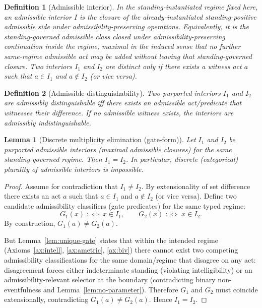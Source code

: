 \documentclass[12pt]{article}
\newtheorem{definition}{Definition}
\newtheorem{lemma}{Lemma}
\begin{document}
\begin{definition}[Admissible interior]
\label{def:interior}
In the standing-instantiated regime fixed here, an \emph{admissible interior} $I$ is the closure of the already-instantiated standing-positive admissible side under admissibility-preserving operations.
Equivalently, it is the standing-governed admissible class closed under admissibility-preserving continuation inside the regime, maximal in the induced sense that no further same-regime admissible act may be added without leaving that standing-governed closure.
Two interiors $I_1$ and $I_2$ are distinct only if there exists a witness act $a$ such that $a\in I_1$ and $a\notin I_2$ (or vice versa).
\end{definition}

\begin{definition}[Admissible distinguishability]
Two purported interiors $I_1$ and $I_2$ are \emph{admissibly distinguishable} iff there exists an admissible act/predicate that witnesses their difference.
If no admissible witness exists, the interiors are admissibly indistinguishable.
\end{definition}

\begin{lemma}[Discrete multiplicity elimination (gate-form)]
\label{lem:discrete-elim}
Let $I_1$ and $I_2$ be purported admissible interiors (maximal admissible closures) for the same standing-governed regime.
Then $I_1=I_2$. In particular, discrete (categorical) plurality of admissible interiors is impossible.
\end{lemma}

\begin{proof}
Assume for contradiction that $I_1\neq I_2$. By extensionality of set difference there exists an act $a$ such that $a\in I_1$ and $a\notin I_2$ (or vice versa).
Define two candidate admissibility classifiers (gate predicates) for the same typed regime:
\[
G_1(x)\;:\!\!\iff\; x\in I_1,\qquad G_2(x)\;:\!\!\iff\; x\in I_2.
\]
By construction, $G_1(a)\neq G_2(a)$.

But Lemma~\ref{lem:unique-gate} states that within the intended regime (Axioms~\ref{ax:intell}, \ref{ax:ametric}, \ref{ax:biv}) there cannot exist two competing admissibility
classifications for the same domain/regime that disagree on any act: disagreement forces either indeterminate standing (violating intelligibility) or an admissibility-relevant selector
at the boundary (contradicting binary non-eventfulness and Lemma~\ref{lem:no-parameter}). Therefore $G_1$ and $G_2$ must coincide extensionally, contradicting $G_1(a)\neq G_2(a)$.
Hence $I_1=I_2$.
\end{proof}
\end{document}
